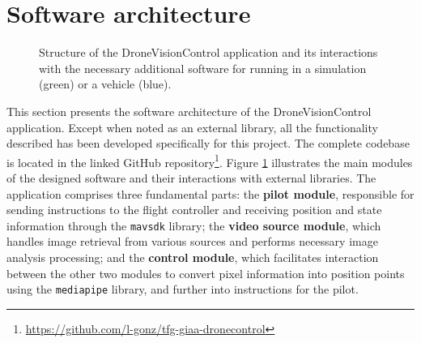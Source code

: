 \section{Software architecture}

\begin{figure}
  \centering
  \caption{Structure of the DroneVisionControl application and its interactions with the necessary additional software for running in a simulation (green) or a vehicle (blue).}
\label{fig:architecture}
\end{figure}

This section presents the software architecture of the DroneVisionControl application. Except when noted as an external library, all the functionality described has been developed specifically for this project. The complete codebase is located in the linked GitHub repository\footnote{\url{https://github.com/l-gonz/tfg-giaa-dronecontrol}}.
Figure \ref{fig:architecture} illustrates the main modules of the designed software and their interactions with external libraries. The application comprises three fundamental parts: the \textbf{pilot module}, responsible for sending instructions to the flight controller and receiving position and state information through the \texttt{mavsdk} library; the \textbf{video source module}, which handles image retrieval from various sources and performs necessary image analysis processing; and the \textbf{control module}, which facilitates interaction between the other two modules to convert pixel information into position points using the \texttt{mediapipe} library, and further into instructions for the pilot.

